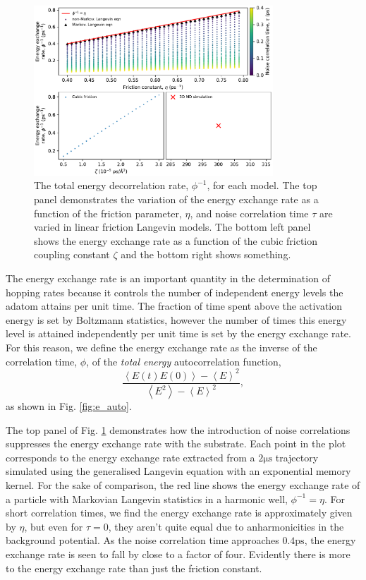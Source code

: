 \documentclass[7pt]{article}
\newcommand{\ps}{\si{\pico\second}}
\newcommand{\us}{\si{\micro\second}}
\begin{document}
\begin{figure}
	\centering
	\includegraphics[width=0.8\textwidth]{energy_exchange_rates}
	\caption{The total energy decorrelation rate, $\phi^{-1}$, for each model. The top panel demonstrates the variation of the energy exchange rate as a function of the friction parameter, $\eta$, and noise correlation time $\tau$ are varied in linear friction Langevin models. The bottom left panel shows the energy exchange rate as a function of the cubic friction coupling constant $\zeta$ and the bottom right shows something.}
	\label{fig:energy_exchange_rates}
\end{figure}

The energy exchange rate is an important quantity in the determination of hopping rates because it controls the number of independent energy levels the adatom attains per unit time. The fraction of time spent above the activation energy is set by Boltzmann statistics, however the number of times this energy level is attained independently per unit time is set by the energy exchange rate. For this reason, we define the energy exchange rate as the inverse of the correlation time, $\phi$, of the \emph{total energy} autocorrelation function, $$\frac{\left<E(t)E(0)\right> - \left<E\right>^2}{\left<E^2\right> - \left<E\right>^2},$$ as shown in Fig. \ref{fig:e_auto}. 
 
The top panel of Fig. \ref{fig:energy_exchange_rates} demonstrates how the introduction of noise correlations suppresses the energy exchange rate with the substrate. Each point in the plot corresponds to the energy exchange rate extracted from a $2\us$ trajectory simulated using the generalised Langevin equation with an exponential memory kernel. For the sake of comparison, the red line shows the energy exchange rate of a particle with Markovian Langevin statistics in a harmonic well, $\phi^{-1}=\eta$. For short correlation times, we find the energy exchange rate is approximately given by $\eta$, but even for $\tau=0$, they aren't quite equal due to anharmonicities in the background potential. As the noise correlation time approaches $0.4\ps$, the energy exchange rate is seen to fall by close to a factor of four. Evidently there is more to the energy exchange rate than just the friction constant. 
\end{document}
